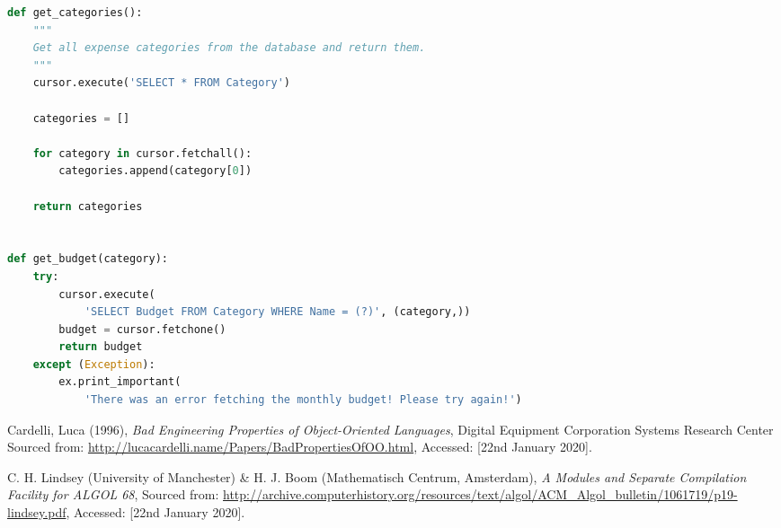 \documentclass[11pt]{article}
\begin{document}
\begin{lstlisting}[language=Python, caption=Source code for \textit{expsql.py}.]
def get_categories():
    """
    Get all expense categories from the database and return them.
    """
    cursor.execute('SELECT * FROM Category')

    categories = []

    for category in cursor.fetchall():
        categories.append(category[0])

    return categories


def get_budget(category):
    try:
        cursor.execute(
            'SELECT Budget FROM Category WHERE Name = (?)', (category,))
        budget = cursor.fetchone()
        return budget
    except (Exception):
        ex.print_important(
            'There was an error fetching the monthly budget! Please try again!')

  \end{lstlisting}

  \begin{thebibliography}{9}
    Cardelli, Luca (1996),
    \textit{Bad Engineering Properties of Object-Oriented Languages},
    Digital Equipment Corporation Systems Research Center
    Sourced from: \url{http://lucacardelli.name/Papers/BadPropertiesOfOO.html},
    Accessed: [22nd January 2020].

    C. H. Lindsey (University of Manchester) \&
    H. J. Boom (Mathematisch Centrum, Amsterdam),
    \textit{A Modules and Separate Compilation Facility for ALGOL 68},
    Sourced from: \url{http://archive.computerhistory.org/resources/text/algol/ACM_Algol_bulletin/1061719/p19-lindsey.pdf},
    Accessed: [22nd January 2020].


  \end{thebibliography}
\end{document}
